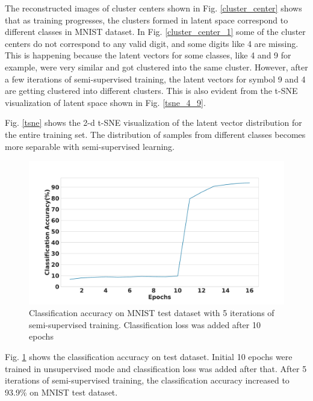 \documentclass[runningheads]{llncs}
\begin{document}
The reconstructed images of cluster centers shown in Fig. \ref{cluster_center} shows that as training progresses, the clusters formed in latent space correspond to different classes in MNIST dataset.
In Fig. \ref{cluster_center_1} some of the cluster centers do not correspond to any valid digit, and some digits like 4  are missing.
This is happening because the latent vectors for some classes, like  4 and 9 for example,  were very similar and got clustered into the same cluster.
However, after a few iterations of semi-supervised training, the latent vectors for symbol 9 and 4 are getting clustered into different clusters.
This is also evident from the t-SNE visualization of latent space shown in Fig. \ref{tsne_4_9}.

Fig. \ref{tsne} shows the 2-d t-SNE visualization of the latent vector distribution for the entire training set.
The distribution of samples from different classes becomes more separable with semi-supervised learning.

\begin{figure}[!t]
\centering
  \centering
  \includegraphics[width=.5\linewidth]{images/classification_acc_semi_supervised}
\caption{Classification accuracy on MNIST test dataset with 5 iterations of semi-supervised training. Classification loss was added after 10 epochs}
\label{classificaion_acc}
\end{figure}

Fig. \ref{classificaion_acc} shows the  classification accuracy on test dataset.
Initial 10 epochs were trained in unsupervised mode and classification loss was added after that.
After 5 iterations of semi-supervised training, the classification accuracy increased to 93.9\% on MNIST test dataset.
\end{document}
